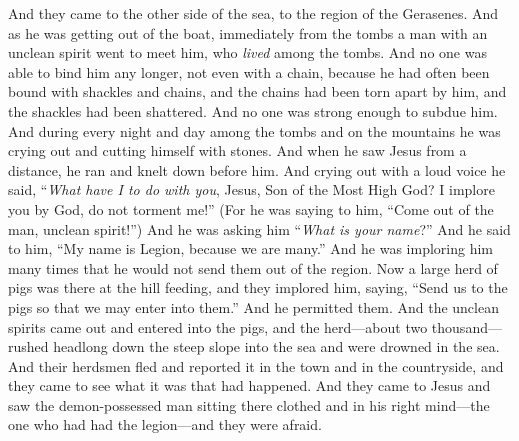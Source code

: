 \begin{biblechapter} %
 And they came to the other side of the sea, to the region of the Gerasenes.
\verse And as he was getting out of the boat, immediately from the tombs a man with an unclean spirit went to meet him,
\verse who \textit{lived} among the tombs. And no one was able to bind him any longer, not even with a chain,
\verse because he had often been bound with shackles and chains, and the chains had been torn apart by him, and the shackles had been shattered. And no one was strong enough to subdue him.
\verse And during every night and day among the tombs and on the mountains he was crying out and cutting himself with stones.
\verse And when he saw Jesus from a distance, he ran and knelt down before him.
\verse And crying out with a loud voice he said, “\textit{What have I to do with you}, Jesus, Son of the Most High God? I implore you by God, do not torment me!”
\verse (For he was saying to him, “Come out of the man, unclean spirit!”)
\verse And he was asking him “\textit{What is your name}?” And he said to him, “My name is Legion, because we are many.”
\verse And he was imploring him many times that he would not send them out of the region.
\verse Now a large herd of pigs was there at the hill feeding,
\verse and they implored him, saying, “Send us to the pigs so that we may enter into them.”
\verse And he permitted them. And the unclean spirits came out and entered into the pigs, and the herd—about two thousand—rushed headlong down the steep slope into the sea and were drowned in the sea.
\verse And their herdsmen fled and reported it in the town and in the countryside, and they came to see what it was that had happened.
\verse And they came to Jesus and saw the demon-possessed man sitting there clothed and in his right mind—the one who had had the legion—and they were afraid.

\end{biblechapter}
